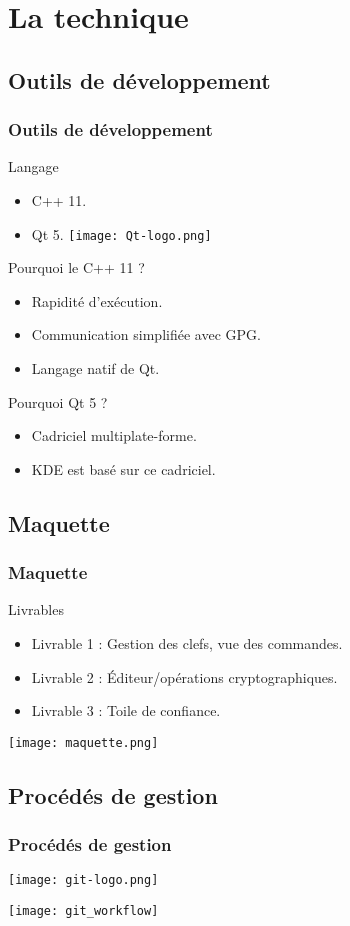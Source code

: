 \section{La technique}

\subsection{Outils de développement}
\begin{frame}
  \frametitle{\color{white} Outils de développement}
  \begin{block}{Langage}
    \begin{itemize}
      \item C++ 11.
      \item Qt 5.
      \hfill
      \texttt{[image: Qt-logo.png]}
    \end{itemize}
  \end{block}
  \begin{block}{Pourquoi le C++ 11 ?}
    \begin{itemize}
      \item Rapidité d'exécution.
      \item Communication simplifiée avec GPG.
      \item Langage natif de Qt.
    \end{itemize}
  \end{block}
  \begin{block}{Pourquoi Qt 5 ?}
    \begin{itemize}
      \item Cadriciel multiplate-forme.
      \item KDE est basé sur ce cadriciel.
    \end{itemize}
  \end{block}
\end{frame}

\subsection{Maquette}
\begin{frame}
  \frametitle{\color{white} Maquette}
  \begin{block}{Livrables}
    \begin{itemize}
      \item Livrable 1 : Gestion des clefs, vue des commandes.
      \item Livrable 2 : Éditeur/opérations cryptographiques.
      \item Livrable 3 : Toile de confiance.
    \end{itemize}
  \end{block}
  \begin{center}
    \texttt{[image: maquette.png]}
  \end{center}
\end{frame}

\subsection{Procédés de gestion}
\begin{frame}
  \frametitle{\color{white} Procédés de gestion}
  \hfill
  \texttt{[image: git-logo.png]}
  \begin{center}
    \texttt{[image: git\_workflow]}
  \end{center}
\end{frame}